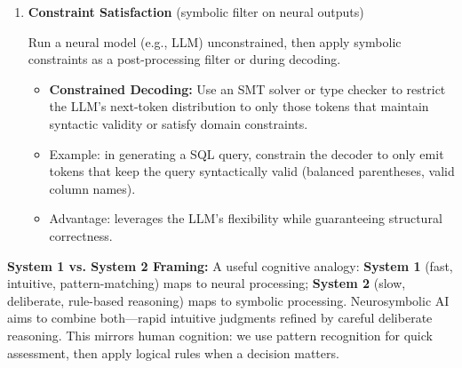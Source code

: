 \begin{enumerate}
    Use an LLM to generate a symbolic program (e.g., logical rules, pseudocode, formal specification) that is then executed by a formal interpreter, which provides feedback.
    \begin{itemize}
        \item \textbf{Program-Aided Language Models (PAL):} Query the LLM to write Python code that solves a math or reasoning problem. The code is executed, and the interpreter output (correct or error message) serves as ground truth. Intermediate results guide the LLM's reasoning.
        \item \textbf{Tree of Thought with Symbolic Verifier:} Explore a tree of candidate solutions (generated by the LLM), using a symbolic verifier or test suite to evaluate each branch. Prune invalid branches; expand promising ones.
        \item Advantage: LLMs are powerful at code and language generation; symbolic execution provides deterministic, verifiable results.
    \end{itemize}

    \item \textbf{Constraint Satisfaction} (symbolic filter on neural outputs)

    Run a neural model (e.g., LLM) unconstrained, then apply symbolic constraints as a post-processing filter or during decoding.
    \begin{itemize}
        \item \textbf{Constrained Decoding:} Use an SMT solver or type checker to restrict the LLM's next-token distribution to only those tokens that maintain syntactic validity or satisfy domain constraints.
        \item Example: in generating a SQL query, constrain the decoder to only emit tokens that keep the query syntactically valid (balanced parentheses, valid column names).
        \item Advantage: leverages the LLM's flexibility while guaranteeing structural correctness.
    \end{itemize}
\end{enumerate}

\textbf{System 1 vs. System 2 Framing:}
A useful cognitive analogy: \textbf{System 1} (fast, intuitive, pattern-matching) maps to neural processing; \textbf{System 2} (slow, deliberate, rule-based reasoning) maps to symbolic processing. Neurosymbolic AI aims to combine both—rapid intuitive judgments refined by careful deliberate reasoning. This mirrors human cognition: we use pattern recognition for quick assessment, then apply logical rules when a decision matters.

